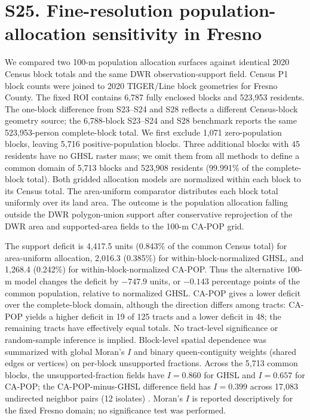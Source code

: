 \documentclass[10pt,a4paper]{article}
\begin{document}
\section*{S25. Fine-resolution population-allocation sensitivity in Fresno}

We compared two 100-m population allocation surfaces against identical 2020 Census block totals and the same DWR observation-support field. Census P1 block counts were joined to 2020 TIGER/Line block geometries for Fresno County. The fixed ROI contains 6,787 fully enclosed blocks and 523,953 residents. The one-block difference from S23--S24 and S28 reflects a different Census-block geometry source; the 6,788-block S23--S24 and S28 benchmark reports the same 523,953-person complete-block total. We first exclude 1,071 zero-population blocks, leaving 5,716 positive-population blocks. Three additional blocks with 45 residents have no GHSL raster mass; we omit them from all methods to define a common domain of 5,713 blocks and 523,908 residents (99.991\% of the complete-block total). Both gridded allocation models are normalized within each block to its Census total. The area-uniform comparator distributes each block total uniformly over its land area. The outcome is the population allocation falling outside the DWR polygon-union support after conservative reprojection of the DWR area and supported-area fields to the 100-m CA-POP grid.

The support deficit is 4,417.5 units (0.843\% of the common Census total) for area-uniform allocation, 2,016.3 (0.385\%) for within-block-normalized GHSL, and 1,268.4 (0.242\%) for within-block-normalized CA-POP. Thus the alternative 100-m model changes the deficit by $-747.9$ units, or $-0.143$ percentage points of the common population, relative to normalized GHSL. CA-POP gives a lower deficit over the complete-block domain, although the direction differs among tracts: CA-POP yields a higher deficit in 19 of 125 tracts and a lower deficit in 48; the remaining tracts have effectively equal totals. No tract-level significance or random-sample inference is implied. Block-level spatial dependence was summarized with global Moran's $I$ and binary queen-contiguity weights (shared edges or vertices) on per-block unsupported fractions. Across the 5,713 common blocks, the unsupported-fraction fields have $I=0.860$ for GHSL and $I=0.657$ for CA-POP; the CA-POP-minus-GHSL difference field has $I=0.399$ across 17,083 undirected neighbor pairs (12 isolates) \citep{moran1950notes}. Moran's $I$ is reported descriptively for the fixed Fresno domain; no significance test was performed.
\end{document}
